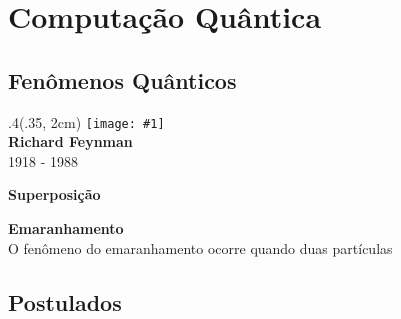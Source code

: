 \documentclass[t]{beamer}
\newcommand{\ket}[1]{\ensuremath{\left|#1\right\rangle}}
\newcommand{\person}[6]{%
\begin{textblock*}{#4}(#5, #6)
	\texttt{[image: \#1]}\\
	\textbf{#2}\\
	{\small #3}
\end{textblock*}
}
\DeclareRobustCommand{\mychar}[1]{%
  \begingroup\normalfont
  \texttt{[image: \#1]}%
  \endgroup
}
\begin{document}
	\section{Computação Quântica}
	
	\subsection{Fenômenos Quânticos}
	
	\begin{frame}{\subsecname}
		\person{feynman.jpg}{Richard Feynman}{1918 - 1988}{.4\paperwidth}{.35\paperwidth}{2cm}
	\end{frame}
	
	\begin{frame}{\subsecname}
		\textbf{Superposição}\\
		\vspace{2cm}
		\begin{overprint}
			\onslide<+>\resizebox{\textwidth}{!}{%
				$$\ket{\Psi} = \ket{\phantom{\Psi}} + \ket{\phantom{\Psi}}$$
			}%
			\onslide<+>\resizebox{\textwidth}{!}{%
				$$\ket{\Psi} = \ket{\uparrow} + \ket{\downarrow}$$
			}%
			\onslide<+>\resizebox{\textwidth}{!}{%
				$$\ket{\Psi} = \ket{\mychar{cara.pdf}} + \ket{\mychar{coroa.pdf}}$$
			}%
			\onslide<+>\resizebox{\textwidth}{!}{%
				$$\ket{\Psi} = \ket{\mychar{alive-cat.pdf}} + \ket{\mychar{dead-cat.pdf}}$$
			}%
			\onslide<+>\resizebox{\textwidth}{!}{%
				$$\ket{\Psi} = \ket{0} + \ket{1}$$
			}%
		\end{overprint}
	\end{frame}	
	
	\begin{frame}{\subsecname}
		\textbf{Emaranhamento}\\
		
		O fenômeno do emaranhamento ocorre quando duas partículas 
	\end{frame}		
	
	\subsection{Postulados}
	
\end{document}
